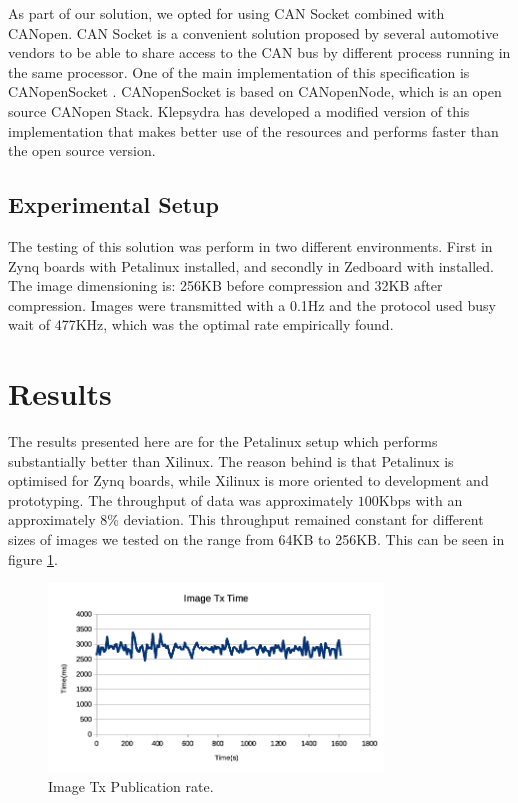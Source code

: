 \documentclass[a4paper,twocolumn]{esapub2005} %
\begin{document}
As part of our solution, we opted for using CAN Socket combined with CANopen. CAN Socket is a convenient solution proposed by several automotive vendors to be able to share access to the CAN bus by different process running in the same processor. One of the main implementation of this specification is CANopenSocket \cite{CANopenSocket}. CANopenSocket is based on CANopenNode, which is an open source CANopen Stack. Klepsydra has developed a modified version of this implementation that makes better use of the resources and performs faster than the open source version.

\subsection{Experimental Setup}
The testing of this solution was perform in two different environments. First in Zynq boards with Petalinux \cite{PETALINUX} installed, and secondly in Zedboard with  \cite{XILLINUX} installed. The image dimensioning is: 256KB before compression and 32KB after compression. Images were transmitted with a 0.1Hz and the protocol used busy wait of 477KHz, which was the optimal rate empirically found.

\section{Results}
The results presented here are for the Petalinux setup which performs substantially better than Xilinux. The reason behind is that Petalinux is optimised for Zynq boards, while Xilinux is more oriented to development and prototyping.  The throughput of data was approximately $100$Kbps with an approximately 8\% deviation. This throughput remained constant for different sizes of images we tested on the range from 64KB to 256KB. This can be seen in figure \ref{fig:image_tx_publication_rate}.

\begin{figure}[H]
\hspace*{-0.7cm}  
\includegraphics[width = 3.5in]{images/image_tx_publication_rate}
\caption{Image Tx Publication rate.\label{fig:image_tx_publication_rate}}
\end{figure}
\end{document}

